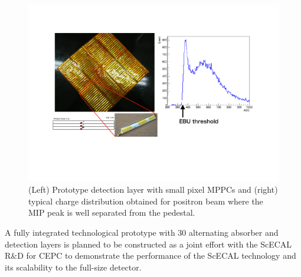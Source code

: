 \begin{figure}[htb]
\centering
\includegraphics[width=1.0\hsize]{Detector/fig/ScWECAL_prototype.pdf}
\caption{(Left) Prototype detection layer with small pixel MPPCs  
   and (right) typical charge distribution obtained for positron beam 
where the MIP peak is well separated from the pedestal.}
\label{fig:det:ScWECAL_prototype}
\end{figure}


A fully integrated technological prototype with 30 alternating absorber and detection 
layers is planned to be constructed 
as a joint effort with the ScECAL R\&D for CEPC 
to demonstrate the performance of the ScECAL technology 
and its scalability to the full-size detector. 

